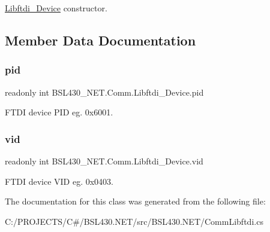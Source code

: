 \mbox{\hyperlink{class_b_s_l430___n_e_t_1_1_comm_1_1_libftdi___device}{Libftdi\+\_\+\+Device}} constructor. 



\subsection{Member Data Documentation}
\mbox{\label{class_b_s_l430___n_e_t_1_1_comm_1_1_libftdi___device_ae7dcdc3716d2cbe2328bd108307e9d2f}} 
\subsubsection{\texorpdfstring{pid}{pid}}
{\footnotesize\ttfamily readonly int B\+S\+L430\+\_\+\+N\+E\+T.\+Comm.\+Libftdi\+\_\+\+Device.\+pid}



F\+T\+DI device P\+ID eg. 0x6001. 

\mbox{\label{class_b_s_l430___n_e_t_1_1_comm_1_1_libftdi___device_ac786cebd3d76766f0c1f212df6d8bdaa}} 
\subsubsection{\texorpdfstring{vid}{vid}}
{\footnotesize\ttfamily readonly int B\+S\+L430\+\_\+\+N\+E\+T.\+Comm.\+Libftdi\+\_\+\+Device.\+vid}



F\+T\+DI device V\+ID eg. 0x0403. 



The documentation for this class was generated from the following file\+:\begin{DoxyCompactItemize}
\item 
C\+:/\+P\+R\+O\+J\+E\+C\+T\+S/\+C\#/\+B\+S\+L430.\+N\+E\+T/src/\+B\+S\+L430.\+N\+E\+T/Comm\+Libftdi.\+cs\end{DoxyCompactItemize}
